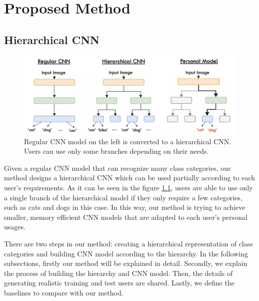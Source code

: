 
\lhead[\chaptername~\thechapter]{\rightmark}

\rhead[\leftmark]{}

\lfoot[\thepage]{}

\cfoot{}

\rfoot[]{\thepage}

\chapter{Proposed Method}
\label{method}


\section{Hierarchical CNN}
\label{sec:HierCNN}

\begin{figure}
    \centering
    \includegraphics[width=\textwidth]{thesis/images/hierarchical-cnn-fig.png}
    \caption{Regular CNN model on the left is converted to a hierarchical CNN. Users can use only some branches depending on their needs.}
    \label{fig:hiermethodoverview}
\end{figure}

Given a regular CNN model that can recognize many class categories, our method designs a hierarchical CNN which can be used partially according to each user's requirements. 
As it can be seen in the figure \ref{fig:hiermethodoverview}, users are able to use only a single branch of the hierarchical model if they only require a few categories, such as cats and dogs in this case. 
In this way, our method is trying to achieve smaller, memory efficient CNN models that are adapted to each user's personal usages.

There are two steps in our method: creating a hierarchical representation of class categories and building CNN model according to the hierarchy.
In the following subsections, firstly our method will be explained in detail.
Secondly, we explain the process of building the hierarchy and CNN model. 
Then, the details of generating realistic training and test users are shared.
Lastly, we define the baselines to compare with our method.

